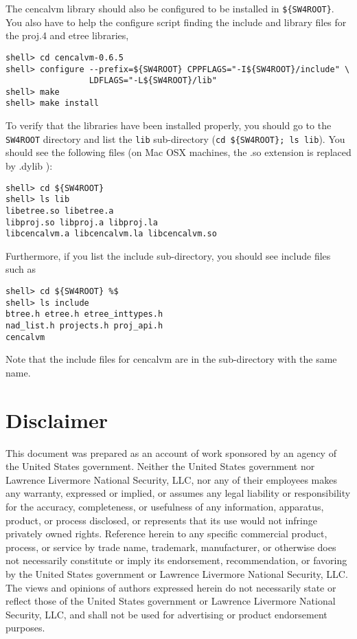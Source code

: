 \documentclass[11pt]{article}
\begin{document}
The cencalvm library should also be configured to be installed in \verb+${SW4ROOT}+. You also have to help
the configure script finding the include and library files for the proj.4 and etree libraries,
\begin{verbatim}
shell> cd cencalvm-0.6.5
shell> configure --prefix=${SW4ROOT} CPPFLAGS="-I${SW4ROOT}/include" \
                 LDFLAGS="-L${SW4ROOT}/lib"
shell> make
shell> make install
\end{verbatim}

To verify that the libraries have been installed properly, you should go to the \verb+SW4ROOT+
directory and list the {\tt lib} sub-directory (\verb+cd ${SW4ROOT}; ls lib+). You should see the
following files (on Mac OSX machines, the .so extension is replaced by .dylib ):
\begin{verbatim}
shell> cd ${SW4ROOT}
shell> ls lib
libetree.so libetree.a 
libproj.so libproj.a libproj.la 
libcencalvm.a libcencalvm.la libcencalvm.so 
\end{verbatim}
Furthermore, if you list the include sub-directory, you should see include files such as 
\begin{verbatim}
shell> cd ${SW4ROOT} %$
shell> ls include
btree.h etree.h etree_inttypes.h
nad_list.h projects.h proj_api.h
cencalvm
\end{verbatim}
Note that the include files for cencalvm are in the sub-directory with the same name.

\section{Disclaimer} 
This document was prepared as an account of work sponsored by an agency of the United States
government. Neither the United States government nor Lawrence Livermore National Security, LLC, nor
any of their employees makes any warranty, expressed or implied, or assumes any legal liability or
responsibility for the accuracy, completeness, or usefulness of any information, apparatus, product,
or process disclosed, or represents that its use would not infringe privately owned
rights. Reference herein to any specific commercial product, process, or service by trade name,
trademark, manufacturer, or otherwise does not necessarily constitute or imply its endorsement,
recommendation, or favoring by the United States government or Lawrence Livermore National Security,
LLC. The views and opinions of authors expressed herein do not necessarily state or reflect those of
the United States government or Lawrence Livermore National Security, LLC, and shall not be used for
advertising or product endorsement purposes. 



 
\end{document}
